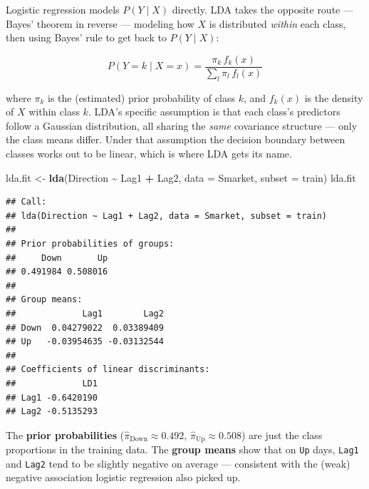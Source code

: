 \documentclass[
  11pt,
]{article}
\newenvironment{Shaded}{\begin{snugshade}}{\end{snugshade}}
\newcommand{\AttributeTok}[1]{\textcolor[rgb]{0.13,0.29,0.53}{#1}}
\newcommand{\FloatTok}[1]{\textcolor[rgb]{0.00,0.00,0.81}{#1}}
\newcommand{\FunctionTok}[1]{\textcolor[rgb]{0.13,0.29,0.53}{\textbf{#1}}}
\newcommand{\NormalTok}[1]{#1}
\newcommand{\OtherTok}[1]{\textcolor[rgb]{0.56,0.35,0.01}{#1}}
\newcommand{\SpecialCharTok}[1]{\textcolor[rgb]{0.81,0.36,0.00}{\textbf{#1}}}
\begin{document}
Logistic regression models \(P(Y \mid X)\) directly. LDA takes the
opposite route --- Bayes' theorem in reverse --- modeling how \(X\) is
distributed \emph{within} each class, then using Bayes' rule to get back
to \(P(Y \mid X)\):

\[
P(Y = k \mid X = x) = \frac{\pi_k \, f_k(x)}{\sum_{l} \pi_l \, f_l(x)}
\]

where \(\pi_k\) is the (estimated) prior probability of class \(k\), and
\(f_k(x)\) is the density of \(X\) within class \(k\). LDA's specific
assumption is that each class's predictors follow a Gaussian
distribution, all sharing the \emph{same} covariance structure --- only
the class means differ. Under that assumption the decision boundary
between classes works out to be linear, which is where LDA gets its
name.

\begin{Shaded}
\begin{Highlighting}[]
\NormalTok{lda.fit }\OtherTok{\textless{}{-}} \FunctionTok{lda}\NormalTok{(Direction }\SpecialCharTok{\textasciitilde{}}\NormalTok{ Lag1 }\SpecialCharTok{+}\NormalTok{ Lag2, }\AttributeTok{data =}\NormalTok{ Smarket, }\AttributeTok{subset =}\NormalTok{ train)}
\NormalTok{lda.fit}
\end{Highlighting}
\end{Shaded}

\begin{verbatim}
## Call:
## lda(Direction ~ Lag1 + Lag2, data = Smarket, subset = train)
## 
## Prior probabilities of groups:
##     Down       Up 
## 0.491984 0.508016 
## 
## Group means:
##             Lag1        Lag2
## Down  0.04279022  0.03389409
## Up   -0.03954635 -0.03132544
## 
## Coefficients of linear discriminants:
##             LD1
## Lag1 -0.6420190
## Lag2 -0.5135293
\end{verbatim}

The \textbf{prior probabilities}
(\(\hat\pi_{\text{Down}} \approx 0.492\),
\(\hat\pi_{\text{Up}} \approx 0.508\)) are just the class proportions in
the training data. The \textbf{group means} show that on \texttt{Up}
days, \texttt{Lag1} and \texttt{Lag2} tend to be slightly negative on
average --- consistent with the (weak) negative association logistic
regression also picked up.

\begin{Shaded}
\end{Shaded}
\end{document}
